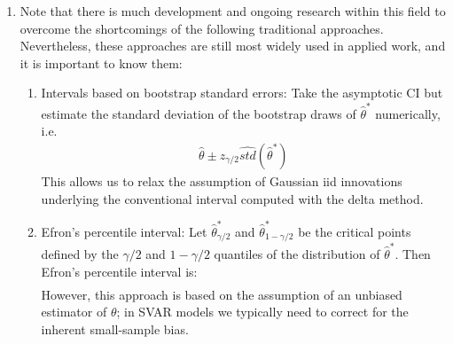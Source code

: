 \begin{enumerate}
\item Note that there is much development and ongoing research within this field to overcome the shortcomings of the following traditional approaches.
Nevertheless, these approaches are still most widely used in applied work, and it is important to know them:
\begin{enumerate}
    \item Intervals based on bootstrap standard errors:
    Take the asymptotic CI but estimate the standard deviation of the bootstrap draws of \(\hat{\theta}^\ast\) numerically, i.e.\
    \begin{align*}
        \hat{\theta} \pm z_{\gamma/2} \widehat{std}(\hat{\theta}^\ast)
    \end{align*}		
    This allows us to relax the assumption of Gaussian iid innovations underlying the conventional interval computed with the delta method.
    
    \item Efron's percentile interval:
    Let \(\hat{\theta}^\ast_{\gamma/2}\) and \(\hat{\theta}^\ast_{1-\gamma/2}\) be the critical points
      defined by the \(\gamma/2\) and \(1-\gamma/2\) quantiles of the distribution of \(\hat{\theta}^\ast \).
    Then Efron's percentile interval is:
    \begin{align*}
        [\hat{\theta}^\ast_{\gamma/2},\hat{\theta}^\ast_{1-\gamma/2}]
    \end{align*}	
    However, this approach is based on the assumption of an unbiased estimator of \(\theta\);
      in SVAR models we typically need to correct for the inherent small-sample bias.


\end{enumerate}
\end{enumerate}
